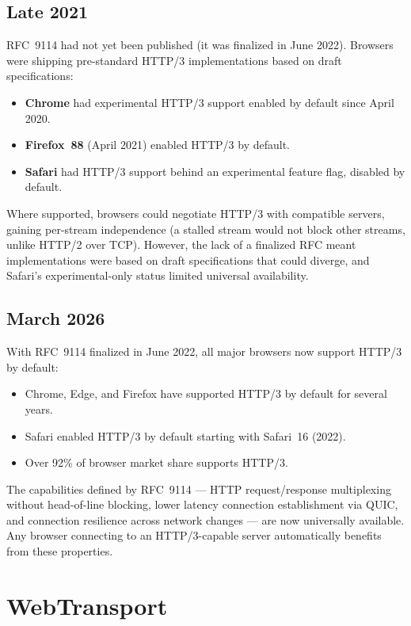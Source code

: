 \documentclass[11pt]{article}
\begin{document}
\subsection{Late 2021}

RFC~9114 had not yet been published (it was finalized in June 2022). Browsers
were shipping pre-standard HTTP/3 implementations based on draft
specifications:

\begin{itemize}
  \item \textbf{Chrome} had experimental HTTP/3 support enabled by default
    since April 2020.
  \item \textbf{Firefox~88} (April 2021) enabled HTTP/3 by default.
  \item \textbf{Safari} had HTTP/3 support behind an experimental feature
    flag, disabled by default.
\end{itemize}

Where supported, browsers could negotiate HTTP/3 with compatible servers,
gaining per-stream independence (a stalled stream would not block other
streams, unlike HTTP/2 over TCP). However, the lack of a finalized RFC meant
implementations were based on draft specifications that could diverge, and
Safari's experimental-only status limited universal availability.

\subsection{March 2026}

With RFC~9114 finalized in June 2022, all major browsers now support HTTP/3
by default:
\begin{itemize}
  \item Chrome, Edge, and Firefox have supported HTTP/3 by default for
    several years.
  \item Safari enabled HTTP/3 by default starting with Safari~16 (2022).
  \item Over 92\% of browser market share supports HTTP/3.
\end{itemize}

The capabilities defined by RFC~9114 --- HTTP request/response multiplexing
without head-of-line blocking, lower latency connection establishment via
QUIC, and connection resilience across network changes --- are now universally
available. Any browser connecting to an HTTP/3-capable server automatically
benefits from these properties.

\section{WebTransport}
\end{document}
